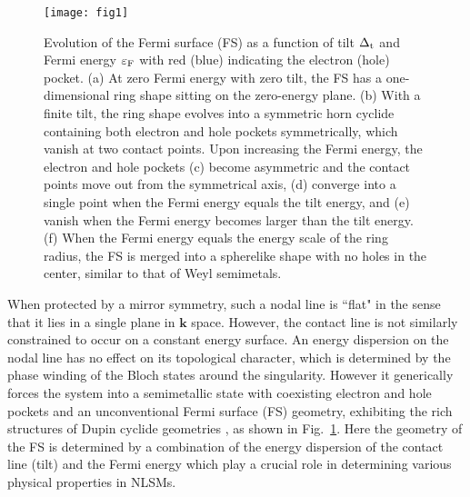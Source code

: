 \documentclass[aps,twocolumn,floatfix]{revtex4-1}
\begin{document}
\begin{figure}[!htb]
\texttt{[image: fig1]}
\caption{
Evolution of the Fermi surface (FS) as a function of tilt $\Delta_{\rm t}$ and Fermi energy $\varepsilon_{\rm F}$ with red (blue) indicating the electron (hole) pocket.
(a) At zero Fermi energy with zero tilt, the FS has a one-dimensional ring shape sitting on the zero-energy plane. (b) With a finite tilt, the ring shape evolves into a symmetric horn cyclide containing both electron and hole pockets symmetrically, which vanish at two contact points. Upon increasing the Fermi energy, the electron and hole pockets (c) become asymmetric and the contact points move out from the symmetrical axis, (d) converge into a single point when the Fermi energy equals the tilt energy, and (e) vanish when the Fermi energy becomes larger than the tilt energy. (f) When the Fermi energy equals the energy scale of the ring radius, the FS is merged into a spherelike shape with no holes in the center, similar to that of Weyl semimetals.
}
\label{fig:duplin_cyclide}
\end{figure}

When protected by a mirror symmetry, such a nodal line is ``flat" in the sense that it lies in a single plane in $\bm{k}$ space. However, the contact line is not similarly constrained to occur on a constant energy surface. An energy dispersion on the nodal line has no effect on its topological character, which is determined by the phase winding of the Bloch states around the singularity. However it generically forces the system into a semimetallic state with coexisting electron and hole pockets and an unconventional Fermi surface (FS) geometry, exhibiting the rich structures of Dupin cyclide geometries \cite{Eisenhart}, as shown in Fig.~\ref{fig:duplin_cyclide}. %
Here the geometry of the FS is determined by a combination of the energy dispersion of the contact line (tilt) and the Fermi energy which play a crucial role in determining various physical properties in NLSMs.
\end{document}
